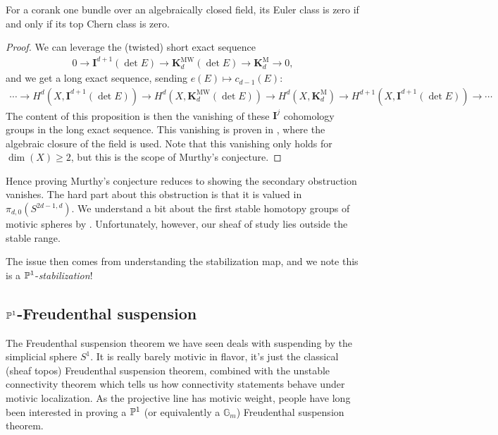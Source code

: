 \documentclass[11pt,openany]{book}
\providecommand{\KM}{\mathbf{K}^\mathrm{M}}
\providecommand{\KMW}{\mathbf{K}^\mathrm{MW}}
\begin{document}
\begin{proposition} \cite[6.3.1]{AF-splitting}
For a corank one bundle over an algebraically closed field, its Euler class is zero if and only if its top Chern class is zero.
\end{proposition}
\begin{proof} We can leverage the (twisted) short exact sequence
\begin{align*}
    0 \to \mathbf{I}^{d+1}(\det E) \to \KMW_d(\det E) \to \KM_d \to 0,
\end{align*}
and we get a long exact sequence, sending $e(E)\mapsto c_{d-1}(E)$:
\begin{align*}
    \cdots \to H^d(X, \mathbf{I}^{d+1}(\det E)) \to H^d(X, \KMW_d(\det E)) \to H^d(X, \KM_d) \to H^{d+1}(X, \mathbf{I}^{d+1}(\det E)) \to \cdots 
\end{align*}
The content of this proposition is then the vanishing of these $\mathbf{I}^j$ cohomology groups in the long exact sequence. This vanishing is proven in \cite[5.2]{AF3}, where the algebraic closure of the field is used. Note that this vanishing only holds for $\dim(X) \ge 2$, but this is the scope of Murthy's conjecture.
\end{proof}

Hence proving Murthy's conjecture reduces to showing the secondary obstruction vanishes. 
The hard part about this obstruction is that it is valued in $\pi_{d,0}(S^{2d-1,d})$. 
We understand a bit about the first stable homotopy groups of motivic spheres by \cite{RSO}. Unfortunately, however, our sheaf of study lies outside the stable range.

The issue then comes from understanding the stabilization map, and we note this is a $\P^1$-\textit{stabilization}!


\subsection{$\P^1$-Freudenthal suspension}

The Freudenthal suspension theorem we have seen deals with suspending by the simplicial sphere $S^1$. It is really barely motivic in flavor, it's just the classical (sheaf topos) Freudenthal suspension theorem, combined with the unstable connectivity theorem which tells us how connectivity statements behave under motivic localization. As the projective line has motivic weight, people have long been interested in proving a $\P^1$ (or equivalently a $\mathbb{G}_m$) Freudenthal suspension theorem.
\end{document}
